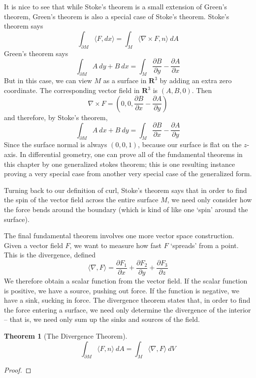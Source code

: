 \documentclass[12pt]{amsbook}
\theoremstyle{plain}
\newtheorem{theorem}{Theorem}
\theoremstyle{definition}
\begin{document}
It is nice to see that while Stoke's theorem is a small extension of Green's theorem, Green's theorem is also a special case of Stoke's theorem. Stoke's theorem says
%
\[ \int_{\partial M} \langle F, dx \rangle = \int_M \langle \nabla \times F, n \rangle\ dA \]
%
Green's theorem says
%
\[ \int_{\partial M} A\ dy + B\ dx = \int_M \frac{\partial B}{\partial y} - \frac{\partial A}{\partial x} \]
%
But in this case, we can view $M$ as a surface in $\mathbf{R}^3$ by adding an extra zero coordinate. The corresponding vector field in $\mathbf{R}^3$ is $(A,B,0)$. Then
%
\[ \nabla \times F = (0,0,\frac{\partial B}{\partial x} - \frac{\partial A}{\partial y}) \]
%
and therefore, by Stoke's theorem,
%
\[ \int_{\partial M} A\ dx + B\ dy = \int_M \frac{\partial B}{\partial x} - \frac{\partial A}{\partial y} \]
%
Since the surface normal is always $(0,0,1)$, because our surface is flat on the $z$-axis. In differential geometry, one can prove all of the fundamental theorems in this chapter by one generalized stokes theorem; this is one resulting instance proving a very special case from another very special case of the generalized form.

Turning back to our definition of curl, Stoke's theorem says that in order to find the spin of the vector field across the entire surface $M$, we need only consider how the force bends around the boundary (which is kind of like one `spin' around the surface).

The final fundamental theorem involves one more vector space construction. Given a vector field $F$, we want to measure how fast $F$ `spreads' from a point. This is the divergence, defined
%
\[ \langle \nabla, F \rangle = \frac{\partial F_1}{\partial x} + \frac{\partial F_2}{\partial y} + \frac{\partial F_3}{\partial z} \]
%
We therefore obtain a scalar function from the vector field. If the scalar function is positive, we have a source, pushing out force. If the function is negative, we have a sink, sucking in force. The divergence theorem states that, in order to find the force entering a surface, we need only determine the divergence of the interior -- that is, we need only sum up the sinks and sources of the field.

\begin{theorem}[The Divergence Theorem]
    \[ \int_{\partial M} \langle F, n \rangle\ dA = \int_M \langle \nabla, F \rangle\ dV \]
\end{theorem}
\begin{proof}
\end{proof}
\end{document}
